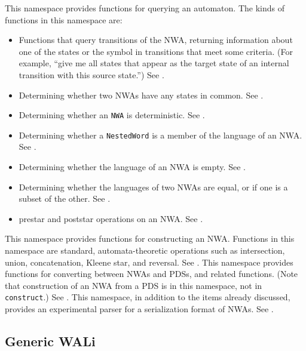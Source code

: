 \begin{functionlist}
   This namespace provides functions for
    querying an automaton. The kinds of functions in this namespace are:
    \begin{itemize}
      \item Functions that query transitions of
        the NWA, returning information about one of the states or the symbol
        in transitions that meet some criteria. (For example, ``give me all
        states that appear as the target state of an internal transition with
        this source state.'') See .
      \item Determining whether two NWAs have any states in
        common. See .
      \item Determining whether an \texttt{NWA} is deterministic. See
        .
      \item Determining whether a \texttt{NestedWord} is a member of the
        language of an NWA. See .
      \item Determining whether the language of an NWA is empty. See
        .
      \item Determining whether the languages of two NWAs are equal, or if
        one is a subset of the other. See .
      \item prestar and poststar operations on an NWA. See
        .
    \end{itemize}
    
   This namespace provides functions for
    constructing an NWA. Functions in this namespace are standard,
    automata-theoretic operations such as intersection, union, concatenation,
    Kleene star, and reversal. See .
   This namespace provides functions for
    converting between NWAs and PDSs, and related functions. (Note that
    construction of an NWA from a PDS is in this namespace, not in
    \texttt{construct}.) See .
   This namespace, in addition to the items already
    discussed, provides an experimental parser for a serialization format of
    NWAs. See .
\end{functionlist}


\subsection{Generic WALi}

